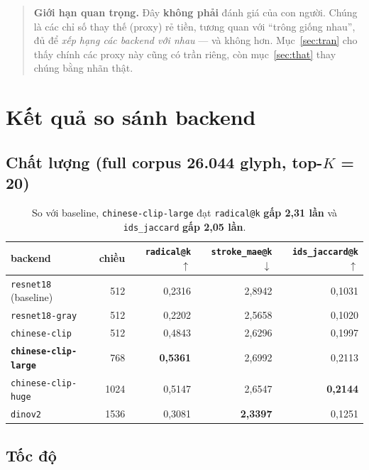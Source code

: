 \documentclass[11pt,a4paper]{article}
\newcommand{\code}[1]{\texttt{#1}}
\newcommand{\up}{$\uparrow$}
\newcommand{\dn}{$\downarrow$}
\begin{document}
\begin{quote}
\textbf{Giới hạn quan trọng.} Đây \textbf{không phải} đánh giá của con người. Chúng là các chỉ số
thay thế (proxy) rẻ tiền, tương quan với ``trông giống nhau'', đủ để \emph{xếp hạng các backend với
nhau} --- và không hơn. Mục~\ref{sec:tran} cho thấy chính các proxy này cũng có trần riêng, còn
mục~\ref{sec:that} thay chúng bằng nhãn thật.
\end{quote}

\section{Kết quả so sánh backend}

\subsection{Chất lượng (full corpus 26.044 glyph, top-$K$ = 20)}

\begin{table}[h]
\centering
\begin{tabular}{lrrrr}
\toprule
backend & chiều & \code{radical@k} \up & \code{stroke\_mae@k} \dn & \code{ids\_jaccard@k} \up \\
\midrule
\code{resnet18} (baseline) & 512 & 0,2316 & 2,8942 & 0,1031 \\
\code{resnet18-gray} & 512 & 0,2202 & 2,5658 & 0,1020 \\
\code{chinese-clip} & 512 & 0,4843 & 2,6296 & 0,1997 \\
\textbf{\code{chinese-clip-large}} & 768 & \textbf{0,5361} & 2,6992 & 0,2113 \\
\code{chinese-clip-huge} & 1024 & 0,5147 & 2,6547 & \textbf{0,2144} \\
\code{dinov2} & 1536 & 0,3081 & \textbf{2,3397} & 0,1251 \\
\bottomrule
\end{tabular}
\caption{So với baseline, \code{chinese-clip-large} đạt \code{radical@k} \textbf{gấp 2,31 lần} và
\code{ids\_jaccard} \textbf{gấp 2,05 lần}.}
\end{table}

\subsection{Tốc độ}
\end{document}
